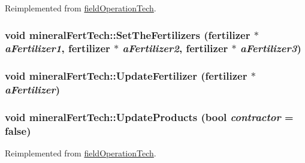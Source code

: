 Reimplemented from \hyperlink{classfield_operation_tech_a2a2c416f3f3fe8ceb2f1f1b63c149a09}{fieldOperationTech}.\hypertarget{classmineral_fert_tech_a462e4b0506bfd8ac6a13a4289e3dc19e}{
\subsubsection[{SetTheFertilizers}]{\setlength{\rightskip}{0pt plus 5cm}void mineralFertTech::SetTheFertilizers ({\bf fertilizer} $\ast$ {\em aFertilizer1}, \/  {\bf fertilizer} $\ast$ {\em aFertilizer2}, \/  {\bf fertilizer} $\ast$ {\em aFertilizer3})}}
\label{classmineral_fert_tech_a462e4b0506bfd8ac6a13a4289e3dc19e}
\hypertarget{classmineral_fert_tech_a33be3a005effa3e1420d9b4d97004445}{
\subsubsection[{UpdateFertilizer}]{\setlength{\rightskip}{0pt plus 5cm}void mineralFertTech::UpdateFertilizer ({\bf fertilizer} $\ast$ {\em aFertilizer})}}
\label{classmineral_fert_tech_a33be3a005effa3e1420d9b4d97004445}
\hypertarget{classmineral_fert_tech_aeaae651d9f15846abd36be1a03e782db}{
\subsubsection[{UpdateProducts}]{\setlength{\rightskip}{0pt plus 5cm}void mineralFertTech::UpdateProducts (bool {\em contractor} = {\ttfamily false})}}
\label{classmineral_fert_tech_aeaae651d9f15846abd36be1a03e782db}


Reimplemented from \hyperlink{classfield_operation_tech_ab0b2bf71efca78b637837fc4d0e3a9d4}{fieldOperationTech}.

